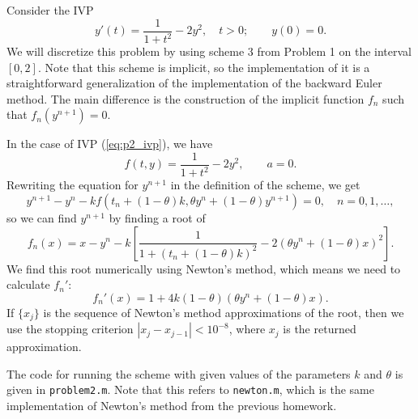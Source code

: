 \documentclass{homework}
\begin{document}
	\question
	
	Consider the IVP
	\begin{equation}
		\label{eq:p2_ivp}
		y'(t) = \frac{1}{1+t^2} - 2y^2, \quad t >0; \qquad y(0) = 0.
	\end{equation}
	We will discretize this problem by using scheme 3 from Problem 1 on the interval $[0,2]$. Note that this scheme is implicit, so the implementation of it is a straightforward generalization of the implementation of the backward Euler method. The main difference is the construction of the implicit function $f_n$ such that $f_n\left(y^{n+1}\right)=0$. 
	
	In the case of IVP (\ref{eq:p2_ivp}), we have
	\begin{equation*}
		f(t,y) = \frac{1}{1+t^2} - 2y^2, \qquad a = 0.
	\end{equation*}
	Rewriting the equation for $y^{n+1}$ in the definition of the scheme, we get
	\begin{equation*}
		y^{n+1} - y^n - kf\left(t_n + (1-\theta)k, \theta y^n + (1-\theta)y^{n+1}\right) = 0, \quad n = 0, 1, \dots,
	\end{equation*}
	so we can find $y^{n+1}$ by finding a root of
	\begin{equation*}
		f_n(x) = x - y^n - k\left[\frac{1}{1+(t_n + (1-\theta)k)^2} - 2(\theta y^n + (1-\theta)x)^2\right].
	\end{equation*}
	We find this root numerically using Newton's method, which means we need to calculate $f_n'$:
	\begin{equation*}
		f_n'(x) = 1 + 4k(1-\theta)(\theta y^n + (1-\theta)x).
	\end{equation*}
	If $\{x_j\}$ is the sequence of Newton's method approximations of the root, then we use the stopping criterion $|x_j - x_{j-1}| < 10^{-8}$, where $x_j$ is the returned approximation.
	
	The code for running the scheme with given values of the parameters $k$ and $\theta$ is given in \lstinline{problem2.m}. Note that this refers to \lstinline{newton.m}, which is the same implementation of Newton's method from the previous homework.
	
	
	
\end{document}
